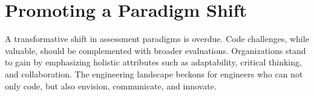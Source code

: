 \documentclass[
    a4paper, %
    10pt, %
    unnumberedsections, %
    twoside, %
]{LTJournalArticle}
\begin{document}
\section{Promoting a Paradigm Shift}

A transformative shift in assessment paradigms is overdue. Code challenges, while valuable, should be complemented with broader evaluations. Organizations stand to gain by emphasizing holistic attributes such as adaptability, critical thinking, and collaboration. The engineering landscape beckons for engineers who can not only code, but also envision, communicate, and innovate.






\begin{comment}

\section{Introduction}

Lorem ipsum dolor sit amet, consectetur adipiscing elit. Sed do eiusmod tempor incididunt ut labore et dolore magna aliqua. Ut enim ad minim veniam, quis nostrud exercitation ullamco laboris nisi ut aliquip ex ea commodo consequat. Duis aute irure dolor in reprehenderit in voluptate velit esse cillum dolore eu fugiat nulla pariatur. Excepteur sint occaecat cupidatat non proident, sunt in culpa qui officia deserunt mollit anim id est laborum. \cite{Doc2023}.



\section{Methodologies}

Lorem ipsum dolor sit amet, consectetur adipiscing elit. Sed do eiusmod tempor incididunt ut labore et dolore magna aliqua. Ut enim ad minim veniam, quis nostrud exercitation ullamco laboris nisi ut aliquip ex ea commodo consequat. Duis aute irure dolor in reprehenderit in voluptate velit esse cillum dolore eu fugiat nulla pariatur. Excepteur sint occaecat cupidatat non proident, sunt in culpa qui officia deserunt mollit anim id est laborum. \cite{dweck2006mindset,duckworth2016grit}.



\subsection{Sample Sites \& Processing}


\end{comment}
\end{document}

